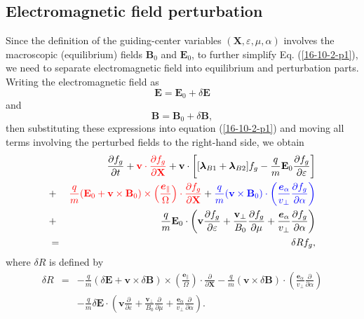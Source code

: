 \documentclass{article}
\newcommand{\tmcolor}[2]{{\color{#1}{#2}}}
\newcommand{\tmmathbf}[1]{\ensuremath{\boldsymbol{#1}}}
\begin{document}
\subsection{Electromagnetic field perturbation}

Since the definition of the guiding-center variables $(\mathbf{X},
\varepsilon, \mu, \alpha)$ involves the macroscopic (equilibrium) fields
$\mathbf{B}_0$ and $\mathbf{E}_0$, to further simplify Eq. (\ref{16-10-2-p1}),
we need to separate electromagnetic field into equilibrium and perturbation
parts. Writing the electromagnetic field as
\begin{equation}
  \label{16-10-27-1} \mathbf{E}=\mathbf{E}_0 + \delta \mathbf{E}
\end{equation}
and
\begin{equation}
  \label{16-10-27-2} \mathbf{B}=\mathbf{B}_0 + \delta \mathbf{B},
\end{equation}
then substituting these expressions into equation (\ref{16-10-2-p1}) and
moving all terms involving the perturbed fields to the right-hand side, we
obtain
\begin{eqnarray}
  &  & \frac{\partial f_g}{\partial t} + \tmcolor{red}{\mathbf{v} \cdot
  \frac{\partial f_g}{\partial \mathbf{X}}} +\mathbf{v} \cdot \left[
  [\tmmathbf{\lambda}_{B 1} +\tmmathbf{\lambda}_{B 2}] f_g - \frac{q}{m}
  \mathbf{E}_0 \frac{\partial f_g}{\partial \varepsilon} \right] \nonumber\\
  & + & \tmcolor{red}{\frac{q}{m} (\mathbf{E}_0 +\mathbf{v} \times
  \mathbf{B}_0) \times \left( \frac{\tmmathbf{e}_{\parallel}}{\Omega}  \right)
  \cdot \frac{\partial f_g}{\partial \mathbf{X}}} + \tmcolor{blue}{\frac{q}{m}
  (\mathbf{v} \times \mathbf{B}_0) \cdot \left(
  \frac{\tmmathbf{e}_{\alpha}}{v_{\perp}}  \frac{\partial f_g}{\partial
  \alpha} \right)} \nonumber\\
  & + & \frac{q}{m} \mathbf{E}_0 \cdot \left( \mathbf{v} \frac{\partial
  f_g}{\partial \varepsilon} + \frac{\mathbf{v}_{\perp}}{B_0}  \frac{\partial
  f_g}{\partial \mu} + \frac{\tmmathbf{e}_{\alpha}}{v_{\perp}}  \frac{\partial
  f_g}{\partial \alpha} \right) \nonumber\\
  & = & \delta R f_g,  \label{16-10-2-p2}
\end{eqnarray}
where $\delta R$ is defined by
\begin{eqnarray}
  \delta R & = & - \frac{q}{m} (\delta \mathbf{E}+\mathbf{v} \times \delta
  \mathbf{B}) \times \left( \frac{\tmmathbf{e}_{\parallel}}{\Omega}  \right)
  \cdot \frac{\partial}{\partial \mathbf{X}} - \frac{q}{m} (\mathbf{v} \times
  \delta \mathbf{B}) \cdot \left( \frac{\tmmathbf{e}_{\alpha}}{v_{\perp}} 
  \frac{\partial}{\partial \alpha} \right) \nonumber\\
  &  & - \frac{q}{m} \delta \mathbf{E} \cdot \left( \mathbf{v}
  \frac{\partial}{\partial \varepsilon} + \frac{\mathbf{v}_{\perp}}{B_0} 
  \frac{\partial}{\partial \mu} + \frac{\tmmathbf{e}_{\alpha}}{v_{\perp}} 
  \frac{\partial}{\partial \alpha} \right) .  \label{16-10-6-1}
\end{eqnarray}
\end{document}
